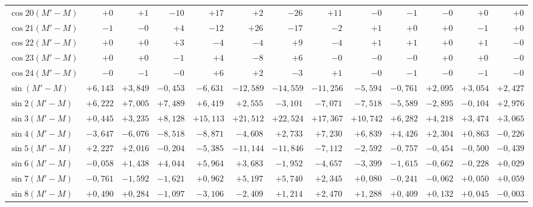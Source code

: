 \begin{landscape}
\begin{longtable}{@{}l|r|r|r|r|r|r|r|r|r|r|r|r@{}}
\(\cos 20(M'-M)\) & \(+0\) & \(+1\) & \(-10\) & \(+17\) & \(+2\) & \(-26\) & \(+11\) & \(-0\) & \(-1\) & \(-0\) & \(+0\) & \(+0\)\\
\(\cos 21(M'-M)\) & \(-1\) & \(-0\) & \(+4\) & \(-12\) & \(+26\) & \(-17\) & \(-2\) & \(+1\) & \(+0\) & \(+0\) & \(-1\) & \(+0\)\\
\(\cos 22(M'-M)\) & \(+0\) & \(+0\) & \(+3\) & \(-4\) & \(-4\) & \(+9\) & \(-4\) & \(+1\) & \(+1\) & \(+0\) & \(+1\) & \(-0\)\\
\(\cos 23(M'-M)\) & \(+0\) & \(+0\) & \(-1\) & \(+4\) & \(-8\) & \(+6\) & \(-0\) & \(-0\) & \(-0\) & \(+0\) & \(+0\) & \(-0\)\\
\(\cos 24(M'-M)\) & \(-0\) & \(-1\) & \(-0\) & \(+6\) & \(+2\) & \(-3\) & \(+1\) & \(-0\) & \(-1\) & \(-0\) & \(-1\) & \(-0\)\\[6pt]
\(\sin(M'-M)\) & \(+6{,}143\) & \(+3{,}849\) & \(-0{,}453\) & \(-6{,}631\) & \(-12{,}589\) & \(-14{,}559\) & \(-11{,}256\) & \(-5{,}594\) & \(-0{,}761\) & \(+2{,}095\) & \(+3{,}054\) & \(+2{,}427\)\\
\(\sin 2(M'-M)\) & \(+6{,}222\) & \(+7{,}005\) & \(+7{,}489\) & \(+6{,}419\) & \(+2{,}555\) & \(-3{,}101\) & \(-7{,}071\) & \(-7{,}518\) & \(-5{,}589\) & \(-2{,}895\) & \(-0{,}104\) & \(+2{,}976\)\\
\(\sin 3(M'-M)\) & \(+0{,}445\) & \(+3{,}235\) & \(+8{,}128\) & \(+15{,}113\) & \(+21{,}512\) & \(+22{,}524\) & \(+17{,}367\) & \(+10{,}742\) & \(+6{,}282\) & \(+4{,}218\) & \(+3{,}474\) & \(+3{,}065\)\\
\(\sin 4(M'-M)\) & \(-3{,}647\) & \(-6{,}076\) & \(-8{,}518\) & \(-8{,}871\) & \(-4{,}608\) & \(+2{,}733\) & \(+7{,}230\) & \(+6{,}839\) & \(+4{,}426\) & \(+2{,}304\) & \(+0{,}863\) & \(-0{,}226\)\\
\(\sin 5(M'-M)\) & \(+2{,}227\) & \(+2{,}016\) & \(-0{,}204\) & \(-5{,}385\) & \(-11{,}144\) & \(-11{,}846\) & \(-7{,}112\) & \(-2{,}592\) & \(-0{,}757\) & \(-0{,}454\) & \(-0{,}500\) & \(-0{,}439\)\\
\(\sin 6(M'-M)\) & \(-0{,}058\) & \(+1{,}438\) & \(+4{,}044\) & \(+5{,}964\) & \(+3{,}683\) & \(-1{,}952\) & \(-4{,}657\) & \(-3{,}399\) & \(-1{,}615\) & \(-0{,}662\) & \(-0{,}228\) & \(+0{,}029\)\\
\(\sin 7(M'-M)\) & \(-0{,}761\) & \(-1{,}592\) & \(-1{,}621\) & \(+0{,}962\) & \(+5{,}197\) & \(+5{,}740\) & \(+2{,}345\) & \(+0{,}080\) & \(-0{,}241\) & \(-0{,}062\) & \(+0{,}050\) & \(+0{,}059\)\\
\(\sin 8(M'-M)\) & \(+0{,}490\) & \(+0{,}284\) & \(-1{,}097\) & \(-3{,}106\) & \(-2{,}409\) & \(+1{,}214\) & \(+2{,}470\) & \(+1{,}288\) & \(+0{,}409\) & \(+0{,}132\) & \(+0{,}045\) & \(-0{,}003\)\\

\end{longtable}
\end{landscape}
